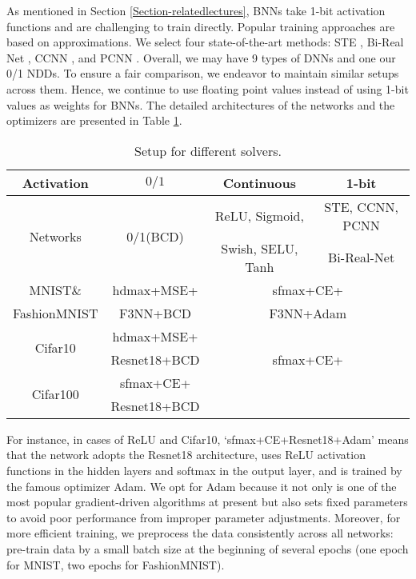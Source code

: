 \documentclass[journal]{IEEEtran}
\begin{document}
{As mentioned in Section \ref{Section-relatedlectures}, BNNs take 1-bit activation functions and are challenging to train directly. Popular training approaches are based on approximations. We select four state-of-the-art methods: STE \cite{courbariaux2015}, Bi-Real Net \cite{Martinez-Yang2020}, CCNN \cite{Xu-Cheung2019}, and PCNN \cite{Gu-Zhang2019}. Overall, we may have 9 types of DNNs  and one our 0/1 NDDs. To ensure a fair comparison, we endeavor to maintain similar setups across them. Hence,   we continue to use floating point values  instead of using 1-bit values as weights for BNNs.  The detailed architectures of the networks and the optimizers are presented in Table \ref{setupdiff}.}
\begin{table}[!th]
	\renewcommand{\arraystretch}{1.25}\addtolength{\tabcolsep}{-3.5pt}
\centering
\caption{Setup for different solvers. \label{setupdiff}}
\begin{tabular}{c|c|c|c}\hline
Activation &$0/1$&Continuous& 1-bit\\\hline 
\multirow{2}{*}{Networks}&\multirow{2}{*}{0/1(BCD)}&ReLU, Sigmoid,& STE, CCNN, PCNN \\
&&Swish, SELU, Tanh& Bi-Real-Net\\\hline
MNIST$\&$&{hdmax+MSE+}&\multicolumn{2}{c}{sfmax+CE+}\\
FashionMNIST&F3NN+BCD&\multicolumn{2}{c}{F3NN+Adam}\\\hline
\multirow{2}{*}{Cifar10} &hdmax+MSE+&\multicolumn{2}{c}{\multirow{3}{*}{sfmax+CE+}}\\
&Resnet18+BCD&\multicolumn{2}{c}{\multirow{3}{*}{Resnet18+Adam}}\\\cline{1-2}
\multirow{2}{*}{Cifar100} &sfmax+CE+& \multicolumn{2}{c}{}\\
&Resnet18+BCD& \multicolumn{2}{c}{}\\\hline
\end{tabular}
\end{table}

{For instance, in cases of ReLU and Cifar10, `sfmax+CE+Resnet18+Adam' means that the network  adopts the   Resnet18 architecture, uses ReLU activation functions in the hidden layers and softmax in the output layer, and is trained by the famous optimizer Adam.  We  opt for  Adam because it not only is one of the most popular gradient-driven algorithms at present but also sets fixed parameters to avoid poor performance from improper parameter adjustments. Moreover, for more efficient training, we preprocess the data consistently across all networks: pre-train data by a small batch size at the beginning of several epochs (one epoch for MNIST, two epochs for FashionMNIST). }
\end{document}
